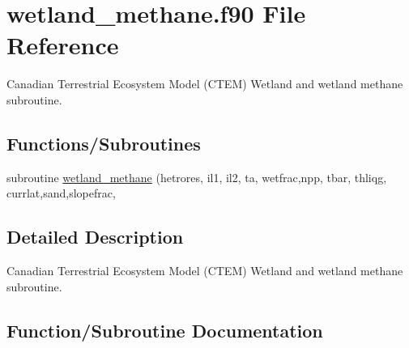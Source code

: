 \hypertarget{wetland__methane_8f90}{}\section{wetland\+\_\+methane.\+f90 File Reference}
\label{wetland__methane_8f90}


Canadian Terrestrial Ecosystem Model (C\+T\+E\+M) Wetland and wetland methane subroutine.  


\subsection*{Functions/\+Subroutines}
\begin{DoxyCompactItemize}
\item 
subroutine \hyperlink{wetland__methane_8f90_a6ebddfd9196f4a9458c8b0a8b1053f90}{wetland\+\_\+methane} (hetrores, il1, il2, ta, wetfrac,npp, tbar, thliqg, currlat,sand,slopefrac,
\end{DoxyCompactItemize}


\subsection{Detailed Description}
Canadian Terrestrial Ecosystem Model (C\+T\+E\+M) Wetland and wetland methane subroutine. 



\subsection{Function/\+Subroutine Documentation}
\hypertarget{wetland__methane_8f90_a6ebddfd9196f4a9458c8b0a8b1053f90}{}
